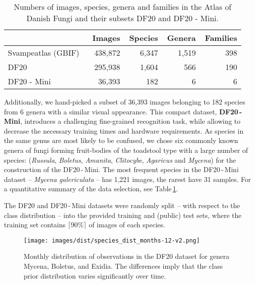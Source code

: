 \documentclass[10pt,twocolumn,letterpaper]{article}
\begin{document}
\begin{table}[t]
\small
\begin{center}
\renewcommand{\arraystretch}{1.1}
\setlength{\tabcolsep}{0.4em}
\begin{tabular}{|l|r|r|r|r|}
\cline{2-5}
\multicolumn{1}{l|}{ } & \multicolumn{1}{c|}{\,\,\,\,Images} & \multicolumn{1}{c|}{\,Species} & \multicolumn{1}{c|}{\,Genera} & \multicolumn{1}{c|}{\,Families} \\
\hline
Svampeatlas (GBIF)& 438,872 & 6,347 & 1,519 & 398 \\
DF20           & 295,938 & 1,604 &   566 & 190 \\
DF20 - Mini    &  36,393 &   182 &     6 &   6 \\
\hline
\end{tabular}
\end{center}
\caption{Numbers of images, species, genera and families in the Atlas of Danish Fungi and their subsets DF20 and DF20 - Mini.}
\label{table:dataset_stats}
\end{table}
Additionally, we hand-picked a subset of 36,393 images belonging to 182 species from 6 genera with a similar visual appearance. This compact dataset, \textbf{DF20\,-\,Mini}, introduces a challenging fine-grained recognition task, while allowing to decrease the necessary training times and hardware requirements.
As species in the same genus are most likely to be confused, we chose six commonly known genera of fungi forming fruit-bodies of the toadstool type with a large number of species: (\textit{Russula}, \textit{Boletus}, \textit{Amanita}, \textit{Clitocybe}, \textit{Agaricus} and \textit{Mycena}) for the construction of the DF20\,-\,Mini. The most frequent species in the DF20\,-\,Mini dataset -- \textit{Mycena galericulata} -- has 1,221 images, the rarest  have 31 samples. For a quantitative summary of the data selection, see Table\,\ref{table:dataset_stats}.

The DF20 and DF20\,-\,Mini datasets were randomly split -- with respect to the class distribution -- into the provided training and (public) test sets, where the training set contains $\lceil 90 \% \rceil$ of images of each species.

\begin{figure*}[t]
\begin{center}
\texttt{[image: images/dist/species\_dist\_months-12-v2.png]}
\caption{Monthly distribution of observations in the DF20 dataset for genera Mycena, Boletus, and Exidia. The differences imply that the class prior distribution varies significantly over time.}
\label{fig:genus_occurence}
\end{center}
\end{figure*}
\end{document}
